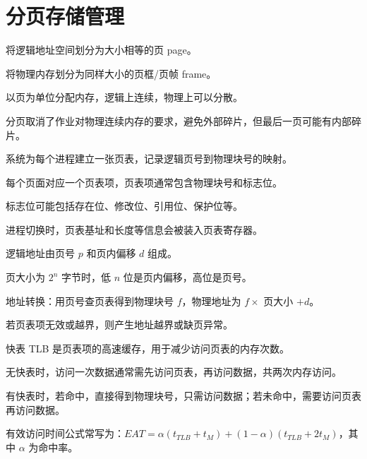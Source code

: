 \section{分页存储管理}
\begin{points}
  \item 将逻辑地址空间划分为大小相等的页 page。
  \item 将物理内存划分为同样大小的页框/页帧 frame。
  \item 以页为单位分配内存，逻辑上连续，物理上可以分散。
  \item 分页取消了作业对物理连续内存的要求，避免外部碎片，但最后一页可能有内部碎片。
\end{points}


\begin{points}
  \item 系统为每个进程建立一张页表，记录逻辑页号到物理块号的映射。
  \item 每个页面对应一个页表项，页表项通常包含物理块号和标志位。
  \item 标志位可能包括存在位、修改位、引用位、保护位等。
  \item 进程切换时，页表基址和长度等信息会被装入页表寄存器。
\end{points}


\begin{points}
  \item 逻辑地址由页号 $p$ 和页内偏移 $d$ 组成。
  \item 页大小为 $2^n$ 字节时，低 $n$ 位是页内偏移，高位是页号。
  \item 地址转换：用页号查页表得到物理块号 $f$，物理地址为 $f\times$ 页大小 $+d$。
  \item 若页表项无效或越界，则产生地址越界或缺页异常。
\end{points}

\begin{points}
  \item 快表 TLB 是页表项的高速缓存，用于减少访问页表的内存次数。
  \item 无快表时，访问一次数据通常需先访问页表，再访问数据，共两次内存访问。
  \item 有快表时，若命中，直接得到物理块号，只需访问数据；若未命中，需要访问页表再访问数据。
  \item 有效访问时间公式常写为：$EAT=\alpha(t_{TLB}+t_M)+(1-\alpha)(t_{TLB}+2t_M)$，其中 $\alpha$ 为命中率。
\end{points}


